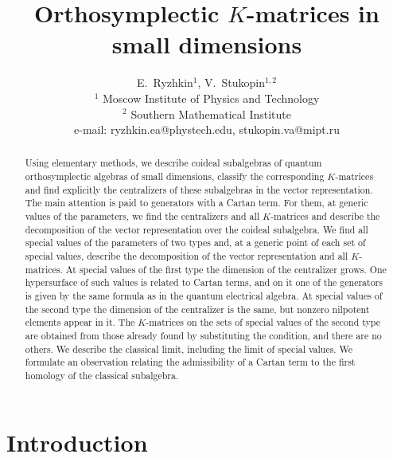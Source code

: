 \documentclass[12pt,a4paper]{article}
\title{Orthosymplectic $K$-matrices in small dimensions}
\author{E.~Ryzhkin${}^{1}$, V.~Stukopin${}^{1,2}$
\vspace{10pt}\\
\small ${}^{1}$ Moscow Institute of Physics and Technology\\
\small
${}^{2}$ Southern Mathematical Institute\\
\small e-mail:
ryzhkin.ea@phystech.edu, stukopin.va@mipt.ru\\
}
\begin{document}
\sloppy
\maketitle

\begin{abstract}
Using elementary methods, we describe coideal subalgebras of quantum orthosymplectic algebras of small dimensions, classify the corresponding $K$-matrices and find explicitly the centralizers of these subalgebras in the vector representation. The main attention is paid to generators with a Cartan term. For them, at generic values of the parameters, we find the centralizers and all $K$-matrices and describe the decomposition of the vector representation over the coideal subalgebra. We find all special values of the parameters of two types and, at a generic point of each set of special values, describe the decomposition of the vector representation and all $K$-matrices. At special values of the first type the dimension of the centralizer grows. One hypersurface of such values is related to Cartan terms, and on it one of the generators is given by the same formula as in the quantum electrical algebra. At special values of the second type the dimension of the centralizer is the same, but nonzero nilpotent elements appear in it. The $K$-matrices on the sets of special values of the second type are obtained from those already found by substituting the condition, and there are no others. We describe the classical limit, including the limit of special values. We formulate an observation relating the admissibility of a Cartan term to the first homology of the classical subalgebra.
\end{abstract}



\section{Introduction}
\end{document}
